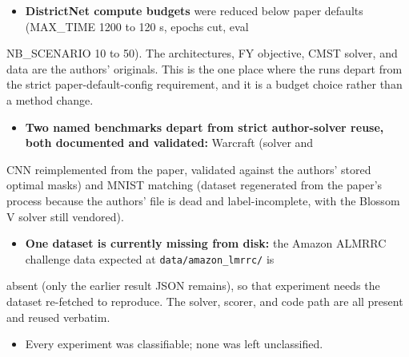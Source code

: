 \documentclass[10pt]{article}
\begin{document}
\begin{itemize}\setlength{\itemsep}{2pt}
\item \textbf{DistrictNet compute budgets} were reduced below paper defaults (MAX\_TIME 1200 to 120 s, epochs cut, eval
\end{itemize}
  NB\_SCENARIO 10 to 50). The architectures, FY objective, CMST solver, and data are the authors' originals. This is the
  one place where the runs depart from the strict paper-default-config requirement, and it is a budget choice rather
  than a method change.

\begin{itemize}\setlength{\itemsep}{2pt}
\item \textbf{Two named benchmarks depart from strict author-solver reuse, both documented and validated:} Warcraft (solver and
\end{itemize}
  CNN reimplemented from the paper, validated against the authors' stored optimal masks) and MNIST matching (dataset
  regenerated from the paper's process because the authors' file is dead and label-incomplete, with the Blossom V solver
  still vendored).

\begin{itemize}\setlength{\itemsep}{2pt}
\item \textbf{One dataset is currently missing from disk:} the Amazon ALMRRC challenge data expected at \texttt{data/amazon\_lmrrc/} is
\end{itemize}
  absent (only the earlier result JSON remains), so that experiment needs the dataset re-fetched to reproduce. The
  solver, scorer, and code path are all present and reused verbatim.

\begin{itemize}\setlength{\itemsep}{2pt}
\item Every experiment was classifiable; none was left unclassified.
\end{itemize}
\end{document}
